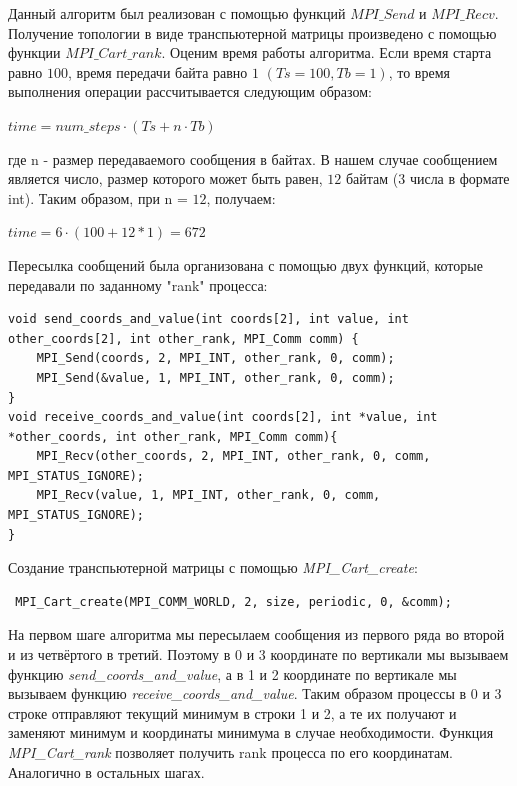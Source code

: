 \documentclass[a4paper]{article}
\begin{document}
Данный алгоритм был реализован с помощью функций $MPI\_Send$ и $MPI\_Recv$. Получение топологии в виде транспьютерной матрицы произведено с помощью функции
$MPI\_Cart\_rank$.
Оценим время работы алгоритма. Если время старта равно $100$, время передачи байта равно $1$ $(Ts=100,Tb=1)$, то время выполнения операции рассчитывается следующим
образом:
\begin{center}
$time = num\_steps · (T s + n · T b)$
\end{center}

где n - размер передаваемого сообщения в байтах. В нашем случае сообщением является
число, размер которого может быть равен, $12$ байтам (3 числа в формате int).
Таким образом, при n = $12$, получаем:
\begin{center}
$time = 6 · (100 + 12 * 1) = 672$
\end{center}
\newpage
Пересылка сообщений была организована с помощью двух функций, которые передавали по заданному "rank"  процесса: 
\begin{lstlisting}
void send_coords_and_value(int coords[2], int value, int other_coords[2], int other_rank, MPI_Comm comm) {
    MPI_Send(coords, 2, MPI_INT, other_rank, 0, comm);
    MPI_Send(&value, 1, MPI_INT, other_rank, 0, comm);
}
void receive_coords_and_value(int coords[2], int *value, int *other_coords, int other_rank, MPI_Comm comm){
    MPI_Recv(other_coords, 2, MPI_INT, other_rank, 0, comm, MPI_STATUS_IGNORE);
    MPI_Recv(value, 1, MPI_INT, other_rank, 0, comm, MPI_STATUS_IGNORE);
}
\end{lstlisting}

Создание транспьютерной матрицы с помощью \textit{MPI\_Cart\_create}:
\begin{lstlisting}
 MPI_Cart_create(MPI_COMM_WORLD, 2, size, periodic, 0, &comm);
\end{lstlisting}

На первом шаге алгоритма мы пересылаем сообщения из первого ряда во второй и из четвёртого в третий. Поэтому в 0 и 3 координате по вертикали мы вызываем функцию \textit{send\_coords\_and\_value}, а в 1 и 2 координате по вертикале мы вызываем функцию \textit{receive\_coords\_and\_value}. Таким образом процессы в 0 и 3 строке отправляют текущий минимум в строки 1 и 2, а те их получают и заменяют минимум и координаты минимума в случае необходимости. Функция \textit{MPI\_Cart\_rank} позволяет получить rank процесса по его координатам. Аналогично в остальных шагах.
\end{document}
